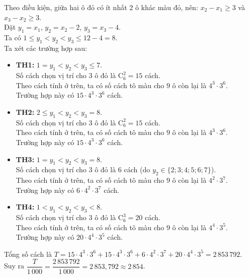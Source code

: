 \begin{ex}
{		Theo điều kiện, giữa hai ô đỏ có ít nhất $2$ ô khác màu đỏ, nên:
		$x_2 - x_1 \ge 3$ và $x_3 - x_2 \ge 3$.\\
		Đặt $y_1 = x_1$, $y_2 = x_2 - 2$, $y_3 = x_3 - 4$.\\
		Ta có $1 \le y_1 < y_2 < y_3 \le 12 - 4 = 8$.\\
		Ta xét các trường hợp sau:
		\begin{itemize}
			\item \textbf{TH1:} $1 = y_1 < y_2 < y_3 \le 7$.\\
			Số cách chọn vị trí cho $3$ ô đỏ là $\mathrm{C}_6^2 = 15$ cách.\\
			Theo cách tính ở trên, ta có số cách tô màu cho $9$ ô còn lại là $4^3\cdot 3^6$.\\
			Trường hợp này có $15\cdot 4^3\cdot 3^6$ cách.
			\item \textbf{TH2:} $2\le y_1 < y_2 < y_3=8$.\\
			Số cách chọn vị trí cho $3$ ô đỏ là $\mathrm{C}_6^2 = 15$ cách.\\
			Theo cách tính ở trên, ta có số cách tô màu cho $9$ ô còn lại là $4^3\cdot 3^6$.\\
			Trường hợp này có $15\cdot 4^3\cdot 3^6$ cách.
			\item \textbf{TH3:} $1=y_1 < y_2 < y_3=8$.\\
			Số cách chọn vị trí cho $3$ ô đỏ là $6$ cách (do $y_2 \in \{2;3;4;5;6;7\}$).\\
			Theo cách tính ở trên, ta có số cách tô màu cho $9$ ô còn lại là $4^2\cdot 3^7$.\\
			Trường hợp này có $6\cdot 4^2\cdot 3^7$ cách.
			\item \textbf{TH4:} $1<y_1 < y_2 < y_3<8$.\\
			Số cách chọn vị trí cho $3$ ô đỏ là $\mathrm{C}_6^3 = 20$ cách.\\
			Theo cách tính ở trên, ta có số cách tô màu cho $9$ ô còn lại là $4^4\cdot 3^5$.\\
			Trường hợp này có $20\cdot 4^4\cdot 3^5$ cách.
		\end{itemize}
		Tổng số cách là $T = 15\cdot 4^3\cdot 3^6+15\cdot 4^3\cdot 3^6+6\cdot 4^2\cdot 3^7+20\cdot 4^4\cdot 3^5= 2\,853\,792$.\\
		Suy ra $\dfrac{T}{1\,000} = \dfrac{2\,853\,792}{1\,000} = 2\,853{,}792\approx 2\,854$.
	}
\end{ex}
